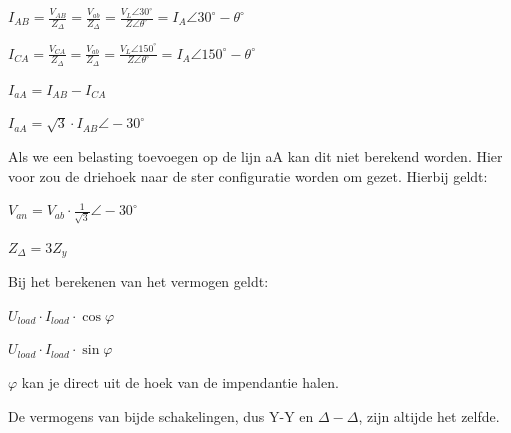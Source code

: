 $I_{AB}=\frac{V_{AB}}{Z_\Delta}=\frac{V_{ab}}{Z_\Delta}=\frac{V_L \angle 30^\circ}{Z\angle \theta^\circ}=I_A \angle 30^\circ - \theta ^\circ$

$I_{CA}=\frac{V_{CA}}{Z_\Delta}=\frac{V_{ab}}{Z_\Delta}=\frac{V_L \angle 150^\circ}{Z\angle \theta^\circ}=I_A \angle 150^\circ - \theta ^\circ$

$I_{aA}=I_{AB}-I_{CA}$

$I_{aA}=\sqrt{3}\cdot I_{AB} \angle -30^\circ$

\vspace{5mm}

Als we een belasting toevoegen op de lijn aA kan dit niet berekend worden. Hier voor zou de driehoek naar de ster configuratie
worden om gezet. Hierbij geldt:

$V_{an}=V_{ab}\cdot \frac{1}{\sqrt{3}}\angle -30^\circ$

$Z_\Delta =3Z_y$

\vspace{5mm}

Bij het berekenen van het vermogen geldt: 

$U_{load}\cdot I_{load} \cdot \cos \varphi$

$U_{load}\cdot I_{load} \cdot \sin \varphi$

$\varphi$ kan je direct uit de hoek van de impendantie halen.

\vspace{5mm}

De vermogens van bijde schakelingen, dus Y-Y en $\Delta - \Delta$, zijn altijde het zelfde.

